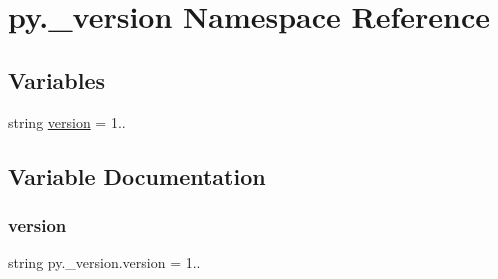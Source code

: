 \hypertarget{namespacepy_1_1__version}{}\section{py.\+\_\+version Namespace Reference}
\label{namespacepy_1_1__version}
\subsection*{Variables}
\begin{DoxyCompactItemize}
\item 
string \hyperlink{namespacepy_1_1__version_aeb755460d2664d44d0ed6fa2c97f0b61}{version} = \textquotesingle{}1..\textquotesingle{}
\end{DoxyCompactItemize}


\subsection{Variable Documentation}
\mbox{\label{namespacepy_1_1__version_aeb755460d2664d44d0ed6fa2c97f0b61}} 
\subsubsection{\texorpdfstring{version}{version}}
{\footnotesize\ttfamily string py.\+\_\+version.\+version = \textquotesingle{}1..\textquotesingle{}}

